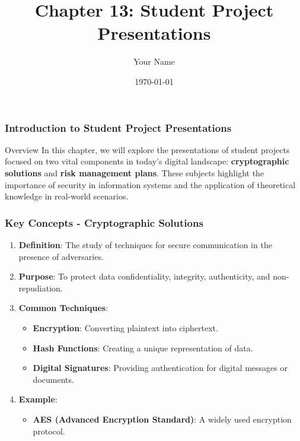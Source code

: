 \documentclass{beamer}
\title{Chapter 13: Student Project Presentations}
\author{Your Name}
\institute{Your Institution}
\date{\today}
\begin{document}
\frame{\titlepage}

\begin{frame}[fragile]
    \frametitle{Introduction to Student Project Presentations}
    \begin{block}{Overview}
        In this chapter, we will explore the presentations of student projects focused on two vital components in today's digital landscape: 
        \textbf{cryptographic solutions} and \textbf{risk management plans}. 
        These subjects highlight the importance of security in information systems and the application of theoretical knowledge in real-world scenarios.
    \end{block}
\end{frame}

\begin{frame}[fragile]
    \frametitle{Key Concepts - Cryptographic Solutions}
    \begin{enumerate}
        \item \textbf{Definition}: The study of techniques for secure communication in the presence of adversaries.
        \item \textbf{Purpose}: To protect data confidentiality, integrity, authenticity, and non-repudiation.
        \item \textbf{Common Techniques}:
        \begin{itemize}
            \item \textbf{Encryption}: Converting plaintext into ciphertext.
            \item \textbf{Hash Functions}: Creating a unique representation of data.
            \item \textbf{Digital Signatures}: Providing authentication for digital messages or documents.
        \end{itemize}
        \item \textbf{Example}: 
        \begin{itemize}
            \item \textbf{AES (Advanced Encryption Standard)}: A widely used encryption protocol.
        \end{itemize}
    \end{enumerate}
\end{frame}
\end{document}
